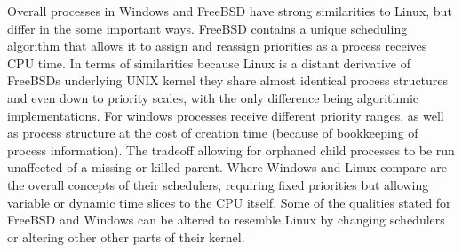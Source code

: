\documentclass[letterpaper,10pt,titlepage]{IEEEtran}
\begin{document}
Overall processes in Windows and FreeBSD have strong similarities to Linux, but differ in the some important ways. FreeBSD contains a unique scheduling algorithm that allows it to assign and reassign priorities as a process receives CPU time. In terms of similarities because Linux is a distant derivative of FreeBSDs underlying UNIX kernel they share almost identical process structures and even down to priority scales, with the only difference being algorithmic implementations. For windows processes receive different priority ranges, as well as process structure at the cost of creation time (because of bookkeeping of process information). The tradeoff allowing for orphaned child processes to be run unaffected of a missing or killed parent. Where Windows and Linux compare are the overall concepts of their schedulers, requiring fixed priorities but allowing variable or dynamic time slices to the CPU itself. Some of the qualities stated for FreeBSD and Windows can be altered to resemble Linux by changing schedulers or altering other other parts of their kernel.
   
  
\nocite{*}%


\end{document}
